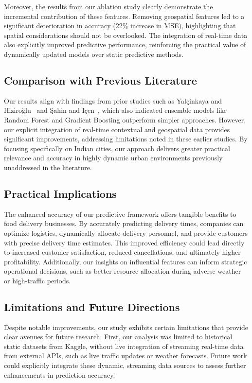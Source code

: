 \documentclass[10pt,twocolumn,letterpaper]{article}
\begin{document}
Moreover, the results from our ablation study clearly demonstrate the incremental contribution of these features. Removing geospatial features led to a significant deterioration in accuracy (22\% increase in MSE), highlighting that spatial considerations should not be overlooked. The integration of real-time data also explicitly improved predictive performance, reinforcing the practical value of dynamically updated models over static predictive methods.

\subsection{Comparison with Previous Literature}
Our results align with findings from prior studies such as Yalçinkaya and Hiziroğlu~\cite{dergipark1} and Şahin and Içen~\cite{dergipark2}, which also indicated ensemble models like Random Forest and Gradient Boosting outperform simpler approaches. However, our explicit integration of real-time contextual and geospatial data provides significant improvements, addressing limitations noted in these earlier studies. By focusing specifically on Indian cities, our approach delivers greater practical relevance and accuracy in highly dynamic urban environments previously unaddressed in the literature.

\subsection{Practical Implications}
The enhanced accuracy of our predictive framework offers tangible benefits to food delivery businesses. By accurately predicting delivery times, companies can optimize logistics, dynamically allocate delivery personnel, and provide customers with precise delivery time estimates. This improved efficiency could lead directly to increased customer satisfaction, reduced cancellations, and ultimately higher profitability. Additionally, our insights on influential features can inform strategic operational decisions, such as better resource allocation during adverse weather or high-traffic periods.

\subsection{Limitations and Future Directions}
Despite notable improvements, our study exhibits certain limitations that provide clear avenues for future research. First, our analysis was limited to historical static datasets from Kaggle, without live integration of streaming real-time data from external APIs, such as live traffic updates or weather forecasts. Future work could explicitly integrate these dynamic, streaming data sources to assess further enhancements in prediction accuracy.
\end{document}
